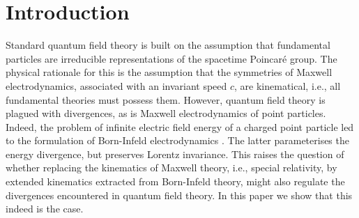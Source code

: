 \documentclass[a4paper,aps,prd,showkeys,showpacs,superscriptaddress,preprint]{revtex4}
\begin{document}
%


\section{Introduction}
Standard quantum field theory is built on the assumption that
fundamental particles are irreducible representations of the spacetime
Poincar\'e group. The physical rationale for this is the
assumption that the symmetries of Maxwell electrodynamics, associated
with an invariant speed $c$, are
kinematical, i.e., all fundamental theories must possess them.
However, quantum field theory is plagued with divergences, as is
Maxwell electrodynamics of point particles. Indeed, the problem of
infinite electric field energy of a charged point particle led to
the formulation of Born-Infeld electrodynamics \cite{Born:1934gh}. The latter parameterises
the energy divergence, but preserves Lorentz invariance. This
raises the question of whether replacing the kinematics of Maxwell
theory, i.e., special relativity, by extended kinematics extracted from
Born-Infeld theory, might also regulate the divergences encountered
in quantum field theory. In this paper we show that this indeed is
the case.\\
\end{document}
